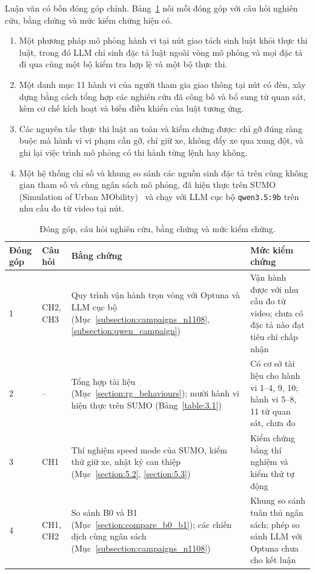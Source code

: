 \documentclass[../main.tex]{subfiles}
\begin{document}
Luận văn có bốn đóng góp chính. Bảng~\ref{table:contrib} nối mỗi đóng góp với câu hỏi nghiên cứu, bằng chứng và mức kiểm chứng hiện có.
\begin{enumerate}
    \item Một phương pháp mô phỏng hành vi tại nút giao tách sinh luật khỏi thực thi luật, trong đó LLM chỉ sinh đặc tả luật ngoài vòng mô phỏng và mọi đặc tả đi qua cùng một bộ kiểm tra hợp lệ và một bộ thực thi.
    \item Một danh mục 11 hành vi của người tham gia giao thông tại nút có đèn, xây dựng bằng cách tổng hợp các nghiên cứu đã công bố và bổ sung từ quan sát, kèm cơ chế kích hoạt và biến điều khiển của luật tương ứng.
    \item Các nguyên tắc thực thi luật an toàn và kiểm chứng được: chỉ gỡ đúng ràng buộc mà hành vi vi phạm cần gỡ, chỉ giữ xe, không đẩy xe qua xung đột, và ghi lại việc trình mô phỏng có thi hành từng lệnh hay không.
    \item Một hệ thống chỉ số và khung so sánh các nguồn sinh đặc tả trên cùng không gian tham số và cùng ngân sách mô phỏng, đã hiện thực trên SUMO (Simulation of Urban MObility)~\cite{lopez2018sumo} và chạy với LLM cục bộ \texttt{qwen3.5:9b} trên nhu cầu đo từ video tại nút.
\end{enumerate}

\begin{table}[!htbp]
\centering
\small
\caption{Đóng góp, câu hỏi nghiên cứu, bằng chứng và mức kiểm chứng.}
\label{table:contrib}
\begin{tabular}{|p{1.4cm}|p{1.3cm}|>{\raggedright\arraybackslash}p{5.3cm}|>{\raggedright\arraybackslash}p{5.1cm}|}
\hline
\textbf{Đóng góp} & \textbf{Câu hỏi} & \textbf{Bằng chứng} & \textbf{Mức kiểm chứng} \\ \hline
1 & CH2, CH3 & Quy trình vận hành trọn vòng với Optuna và LLM cục bộ (Mục~\ref{subsection:campaigns_n1108}, \ref{subsection:qwen_campaign}) & Vận hành được với nhu cầu đo từ video; chưa có đặc tả nào đạt tiêu chí chấp nhận \\ \hline
2 & -- & Tổng hợp tài liệu (Mục~\ref{section:rg_behaviours}); mười hành vi hiện thực trên SUMO (Bảng~\ref{table:3.1}) & Có cơ sở tài liệu cho hành vi 1--4, 9, 10; hành vi 5--8, 11 từ quan sát, chưa đo \\ \hline
3 & CH1 & Thí nghiệm speed mode của SUMO, kiểm thử giữ xe, nhật ký can thiệp (Mục~\ref{section:5.2}, \ref{section:5.3}) & Kiểm chứng bằng thí nghiệm và kiểm thử tự động \\ \hline
4 & CH1, CH2 & So sánh B0 và B1 (Mục~\ref{section:compare_b0_b1}); các chiến dịch cùng ngân sách (Mục~\ref{subsection:campaigns_n1108}) & Khung so sánh tuân thủ ngân sách; phép so sánh LLM với Optuna chưa cho kết luận \\ \hline
\end{tabular}
\end{table}
\end{document}
